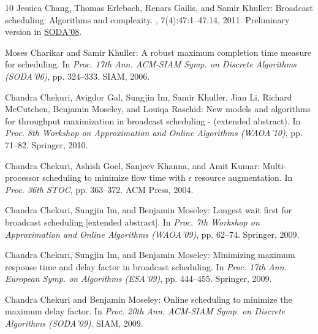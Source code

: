 \begin{thebibliography}{10}
{\sc Jessica Chang, Thomas Erlebach, Renars Gailis, and Samir Khuller}:
  Broadcast scheduling: Algorithms and complexity.
, 7(4):47:1--47:14, 2011.
\newblock Preliminary version in
  \href{https://dl.acm.org/citation.cfm?doid=1347082.1347134}{SODA'08}.
\newblock [\epfmtdoi{10.1145/2000807.2000815}]

{\sc Moses Charikar and Samir Khuller}: A robust maximum completion time
  measure for scheduling.
\newblock In {\em Proc. 17th Ann. ACM-SIAM Symp. on Discrete Algorithms
  (SODA'06)}, pp. 324--333. SIAM, 2006.
\newblock [\epfmtdoi{10.1145/1109557.1109594}]

{\sc Chandra Chekuri, Avigdor Gal, Sungjin Im, Samir Khuller, Jian Li, Richard
  McCutchen, Benjamin Moseley, and Louiqa Raschid}: New models and algorithms
  for throughput maximization in broadcast scheduling - (extended abstract).
\newblock In {\em Proc. 8th Workshop on Approximation and Online Algorithms
  (WAOA'10)}, pp. 71--82. Springer, 2010.
\newblock [\epfmtdoi{10.1007/978-3-642-18318-8\_7}]

{\sc Chandra Chekuri, Ashish Goel, Sanjeev Khanna, and Amit Kumar}:
  Multi-processor scheduling to minimize flow time with $\epsilon$ resource
  augmentation.
\newblock In {\em Proc. 36th STOC}, pp. 363--372. ACM Press, 2004.
\newblock [\epfmtdoi{10.1145/1007352.1007411}]

{\sc Chandra Chekuri, Sungjin Im, and Benjamin Moseley}: Longest wait first for
  broadcast scheduling [extended abstract].
\newblock In {\em Proc. 7th Workshop on Approximation and Online Algorithms
  (WAOA'09)}, pp. 62--74. Springer, 2009.
\newblock [\epfmtdoi{10.1007/978-3-642-12450-1\_6}]

{\sc Chandra Chekuri, Sungjin Im, and Benjamin Moseley}: Minimizing maximum
  response time and delay factor in broadcast scheduling.
\newblock In {\em Proc. 17th Ann. European Symp. on Algorithms (ESA'09)}, pp.
  444--455. Springer, 2009.
\newblock [\epfmtdoi{10.1007/978-3-642-04128-0\_40}]

{\sc Chandra Chekuri and Benjamin Moseley}: Online scheduling to minimize the
  maximum delay factor.
\newblock In {\em Proc. 20th Ann. ACM-SIAM Symp. on Discrete Algorithms
  (SODA'09)}. SIAM, 2009.


\end{thebibliography}
